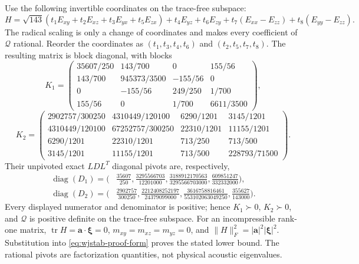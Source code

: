 \documentclass[11pt,a4paper]{article}
\numberwithin{equation}{section}
\begin{document}
Use the following invertible coordinates on the trace-free subspace:
\begin{equation}
 H=\sqrt{143}(t_1E_{xy}+t_2E_{xz}+t_3E_{yx}+t_5E_{zx})
       +t_4E_{yz}+t_6E_{zy}
       +t_7(E_{xx}-E_{zz})+t_8(E_{yy}-E_{zz}).
 \label{eq:wjstab-proof-coordinates}
\end{equation}
The radical scaling is only a change of coordinates and makes every
coefficient of $\mathcal Q$ rational. Reorder the coordinates as
$(t_1,t_3,t_4,t_6)$ and $(t_2,t_5,t_7,t_8)$. The resulting matrix is
block diagonal, with blocks
\begin{equation}
 K_1=\begin{pmatrix}
 35607/250&143/700&0&155/56\\
 143/700&945373/3500&-155/56&0\\
 0&-155/56&249/250&1/700\\
 155/56&0&1/700&6611/3500
 \end{pmatrix},
 \label{eq:wjstab-proof-block1}
\end{equation}
\begin{equation}
 K_2=\begin{pmatrix}
 2902757/300250&4310449/120100&6290/1201&3145/1201\\
 4310449/120100&67252757/300250&22310/1201&11155/1201\\
 6290/1201&22310/1201&713/250&713/500\\
 3145/1201&11155/1201&713/500&228793/71500
 \end{pmatrix}.
 \label{eq:wjstab-proof-block2}
\end{equation}
Their unpivoted exact $LDL^T$ diagonal pivots are, respectively,
\begin{align}
 \operatorname{diag}(D_1)=\bigg(&\frac{35607}{250},
 \frac{3295566703}{12201000},
 \frac{3188912170563}{3295566703000},
 \frac{609851247}{332332000}\bigg),
 \label{eq:wjstab-proof-pivots1}\\
 \operatorname{diag}(D_2)=\bigg(&\frac{2902757}{300250},
 \frac{2212408252197}{24379099000},
 \frac{3616758816461}{553102063049250},
 \frac{355627}{143000}\bigg).
 \label{eq:wjstab-proof-pivots2}
\end{align}
Every displayed numerator and denominator is positive; hence
$K_1\succ0$, $K_2\succ0$, and $\mathcal Q$ is positive definite on
the trace-free subspace. For an incompressible rank-one matrix,
$\operatorname{tr}H=\boldsymbol a\cdot\boldsymbol\xi=0$,
$m_{xy}=m_{xz}=m_{yz}=0$, and
$\|H\|_F^2=|\boldsymbol a|^2|\boldsymbol\xi|^2$. Substitution into
\eqref{eq:wjstab-proof-form} proves the stated lower bound.
The rational pivots are factorization quantities, not physical acoustic
eigenvalues.
\end{document}
